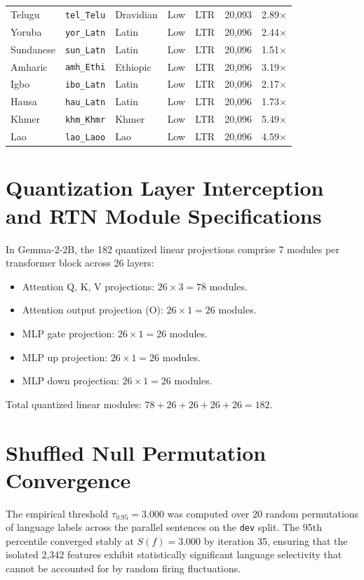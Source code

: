 \documentclass[11pt]{article}
\begin{document}
\begin{center}
\begin{tabularx}{\textwidth}{llllcrr}
Telugu & \texttt{tel\_Telu} & Dravidian & Low & LTR & 20,093 & 2.89$\times$ \\
Yoruba & \texttt{yor\_Latn} & Latin & Low & LTR & 20,096 & 2.44$\times$ \\
Sundanese & \texttt{sun\_Latn} & Latin & Low & LTR & 20,096 & 1.51$\times$ \\
Amharic & \texttt{amh\_Ethi} & Ethiopic & Low & LTR & 20,096 & 3.19$\times$ \\
Igbo & \texttt{ibo\_Latn} & Latin & Low & LTR & 20,096 & 2.17$\times$ \\
Hausa & \texttt{hau\_Latn} & Latin & Low & LTR & 20,096 & 1.73$\times$ \\
Khmer & \texttt{khm\_Khmr} & Khmer & Low & LTR & 20,096 & 5.49$\times$ \\
Lao & \texttt{lao\_Laoo} & Lao & Low & LTR & 20,096 & 4.59$\times$ \\
\bottomrule
\end{tabularx}
\label{tab:full_panel_metadata}
\end{center}

\section{Quantization Layer Interception and RTN Module Specifications}
\label{sec:appendix_rtn}
In Gemma-2-2B, the 182 quantized linear projections comprise 7 modules per transformer block across 26 layers:
\begin{itemize}
    \item Attention Q, K, V projections: $26 \times 3 = 78$ modules.
    \item Attention output projection (O): $26 \times 1 = 26$ modules.
    \item MLP gate projection: $26 \times 1 = 26$ modules.
    \item MLP up projection: $26 \times 1 = 26$ modules.
    \item MLP down projection: $26 \times 1 = 26$ modules.
\end{itemize}
Total quantized linear modules: $78 + 26 + 26 + 26 + 26 = 182$.

\section{Shuffled Null Permutation Convergence}
\label{sec:appendix_null}
The empirical threshold $\tau_{0.95} = 3.000$ was computed over 20 random permutations of language labels across the parallel sentences on the \texttt{dev} split. The 95th percentile converged stably at $S(f) = 3.000$ by iteration 35, ensuring that the isolated 2,342 features exhibit statistically significant language selectivity that cannot be accounted for by random firing fluctuations.
\end{document}
